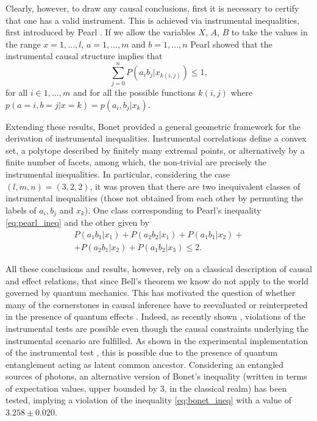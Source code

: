 \documentclass[letterpaper]{article}
\begin{document}
Clearly, however, to draw any causal conclusions, first it is necessary to
certify that one has a valid instrument. This is achieved via instrumental
inequalities, first introduced by Pearl \cite{Pearl1995}. If we allow the variables $X$,
$A$, $B$ to take the values in the range  $x=1,\dots,l$, $a=1,\dots,m$ and
$b=1,\dots,n$ Pearl showed that the instrumental causal structure implies that 
\begin{equation} 
    \sum_{j=0}^{n} P(a_i b_j|x_{k(i,j)}) \le 1,
    \label{eq:pearl_ineq}
\end{equation}
for all $i \in {1,\ldots, m}$ and for all the possible functions $k(i,j)$ where $p(a=i,b=j\vert x=k)=p(a_i,b_j|x_k)$.

Extending these results, Bonet \cite{bonet2001} provided a 
general geometric framework for the derivation of instrumental inequalities.
Instrumental correlations define a convex set, a polytope described by finitely
many extremal points, or alternatively by a finite number of facets, among which, the
non-trivial are precisely the instrumental inequalities. In particular,
considering the case $(l,m,n) = (3,2,2)$, it was proven that there are two
inequivalent classes of instrumental inequalities (those not obtained from each
other by permuting the labels of $a_i,b_j$ and $x_k$). One class corresponding
to Pearl's inequality \eqref{eq:pearl_ineq} and the other given by
\begin{multline}
    P(a_1 b_1 | x_1) + P(a_2 b_2 | x_1) + 
    P(a_1 b_1 | x_2) +\\+ P(a_2 b_1 | x_2) + 
    P(a_1 b_2 | x_3) \le 2.
    \label{eq:bonet_ineq}
\end{multline}

All these conclusions and results, however, rely on a classical description of
causal and effect relations, that since Bell's theorem \cite{} we know do not
apply to the world governed by quantum mechanics. This has motivated the
question of whether many of the cornerstones in causal inference have to
reevaluated or reinterpreted in the presence of quantum effects \cite{}. Indeed,
as recently shown \cite{chaves2018}, violations of the instrumental tests are
possible even though the causal constraints underlying the instrumental scenario
are fulfilled. As shown in the experimental implementation of the instrumental
test \cite{chaves2018}, this is possible due to the presence of quantum entanglement
acting as latent common ancestor. Considering an entangled sources of photons,
an alternative version of Bonet's inequality (written in terms of expectation
values, upper bounded by 3, in the classical realm) has been tested, implying a
violation of the inequality \eqref{eq:bonet_ineq} with a 
value of $3.258 \pm 0.020$. 
\end{document}
